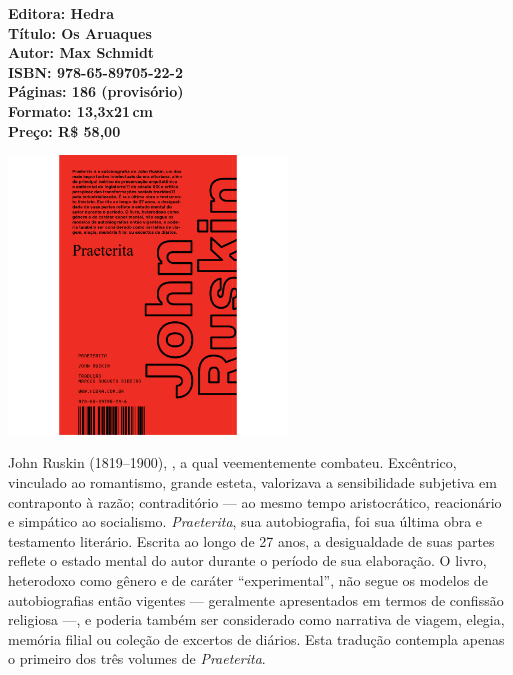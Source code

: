 \vfill
\noindent\begin{minipage}[c]{1\linewidth}
{\small\textbf{
\hspace*{-.1cm}Editora: Hedra\\
Título: Os Aruaques\\
Autor: Max Schmidt\\ 
ISBN: 978-65-89705-22-2\\
Páginas: 186 (provisório)\\
Formato: 13,3x21\,cm\\
Preço: R\$ 58,00\\
}}
\end{minipage}
\pagebreak

\begin{center}
\hspace*{.5cm}\includegraphics[width=74mm]{./CAPAS/HEDRA_RUSKIN.jpg}
\end{center}
\hspace*{-7cm}\hrulefill\hspace*{-7cm}
\medskip

\noindent{}John Ruskin (1819--1900), , a qual veementemente combateu. Excêntrico, vinculado ao romantismo, grande esteta, valorizava a sensibilidade subjetiva em contraponto à razão; contraditório --- ao mesmo tempo aristocrático, reacionário e simpático ao socialismo. \textit{Praeterita}, sua autobiografia, foi sua última obra e testamento literário. Escrita ao longo de 27 anos, a desigualdade de suas partes reflete o estado mental do autor durante o período de sua elaboração. O livro, heterodoxo como gênero e de caráter ``experimental'', não segue os modelos de autobiografias então vigentes --- geralmente apresentados em termos de confissão religiosa ---, e poderia também ser considerado como narrativa de viagem, elegia, memória filial ou coleção de excertos de diários. Esta tradução contempla apenas o primeiro dos três volumes de \textit{Praeterita}.

